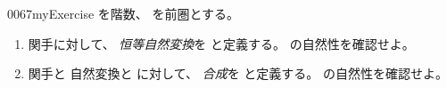 \documentclass[index]{subfiles}
\begin{document}
\begin{myBlock}{0067}{myExercise}
  を階数、
  を前圏とする。
  \begin{enumerate}
  \item 関手に対して、
    \emph{恒等自然変換}を
    と定義する。
    の自然性を確認せよ。
  \item 関手と
    自然変換と
    に対して、
    \emph{合成}を
    と定義する。
    の自然性を確認せよ。
  \end{enumerate}
\end{myBlock}
\end{document}
